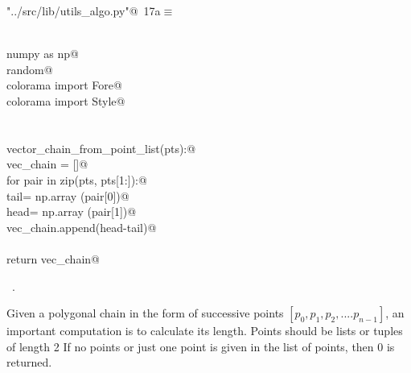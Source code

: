 \documentclass[11.5pt]{report}
\begin{document}
\begin{flushleft} \small\label{scrap12}\raggedright\small
{} \verb@"../src/lib/utils_algo.py"@\nobreak\ {\footnotesize {17a}}$\equiv$
\vspace{-1ex}
\begin{list}{}{} \item
\mbox{}\verb@@\\
\mbox{}\verb@import numpy as np@\\
\mbox{}\verb@import random@\\
\mbox{}\verb@from colorama import Fore@\\
\mbox{}\verb@from colorama import Style@\\
\mbox{}\verb@@\\
\mbox{}\verb@@\\
\mbox{}\verb@def vector_chain_from_point_list(pts):@\\
\mbox{}\verb@    vec_chain = []@\\
\mbox{}\verb@    for pair in zip(pts, pts[1:]):@\\
\mbox{}\verb@        tail= np.array (pair[0])@\\
\mbox{}\verb@        head= np.array (pair[1])@\\
\mbox{}\verb@        vec_chain.append(head-tail)@\\
\mbox{}\verb@@\\
\mbox{}\verb@    return vec_chain@\\
\mbox{}\verb@@{\NWsep}
\end{list}
\vspace{-1.5ex}
\footnotesize
\begin{list}{}{\setlength{\itemsep}{-\parsep}\setlength{\itemindent}{-\leftmargin}}
\item \NWtxtFileDefBy\ .

\item{}
\end{list}
\vspace{4ex}
\end{flushleft}

\newchunk Given a polygonal chain in the form of successive points  $[p_0,p_1,p_2,....p_{n-1}]$, 
an important computation is to calculate its length. Points should be lists or tuples of length 2
If no points or just one point is given in the list of points, then 0 is returned.
\end{document}

